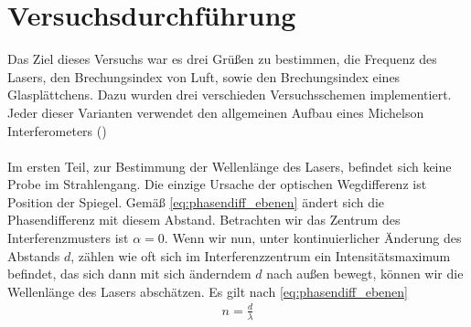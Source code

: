 \chapter{Versuchsdurchführung}
Das Ziel dieses Versuchs war es drei Grüßen zu bestimmen, die Frequenz des Lasers, den Brechungsindex von Luft, sowie den Brechungsindex eines Glasplättchens. Dazu wurden drei verschieden Versuchsschemen implementiert. Jeder dieser Varianten verwendet den allgemeinen Aufbau eines Michelson Interferometers ()\\\\
Im ersten Teil, zur Bestimmung der Wellenlänge des Lasers, befindet sich keine Probe im Strahlengang. Die einzige Ursache der optischen Wegdifferenz ist Position der Spiegel. Gemäß \eqref{eq:phasendiff_ebenen} ändert sich die Phasendifferenz mit diesem Abstand. Betrachten wir das Zentrum des Interferenzmusters ist $\alpha=0$. Wenn wir nun, unter kontinuierlicher Änderung des Abstands $d$, zählen wie oft sich im Interferenzzentrum ein Intensitätsmaximum befindet, das sich dann mit sich änderndem $d$ nach außen bewegt, können wir die Wellenlänge des Lasers abschätzen. Es gilt nach \eqref{eq:phasendiff_ebenen}
\begin{align*}
    n=\frac{d}{\lambda}
\end{align*}

